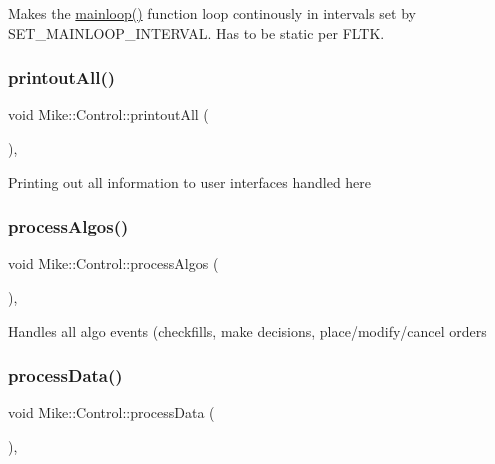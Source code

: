 Makes the \hyperlink{class_mike_1_1_control_a3440083f03f7da3d4490fa44bc13d62b}{mainloop()} function loop continously in intervals set by S\+E\+T\+\_\+\+M\+A\+I\+N\+L\+O\+O\+P\+\_\+\+I\+N\+T\+E\+R\+V\+AL. Has to be static per F\+L\+TK. \mbox{\label{class_mike_1_1_control_a2f239c6bace6fba6d31d54919b7ee6e1}} 
\subsubsection{\texorpdfstring{printout\+All()}{printoutAll()}}
{\footnotesize\ttfamily void Mike\+::\+Control\+::printout\+All (\begin{DoxyParamCaption}{ }\end{DoxyParamCaption})\hspace{0.3cm}{\ttfamily [inline]}, {\ttfamily [private]}}

Printing out all information to user interfaces handled here \mbox{\label{class_mike_1_1_control_acf3d41cb5dd54a2ee31cfb0709a79e7e}} 
\subsubsection{\texorpdfstring{process\+Algos()}{processAlgos()}}
{\footnotesize\ttfamily void Mike\+::\+Control\+::process\+Algos (\begin{DoxyParamCaption}{ }\end{DoxyParamCaption})\hspace{0.3cm}{\ttfamily [inline]}, {\ttfamily [private]}}

Handles all algo events (checkfills, make decisions, place/modify/cancel orders \mbox{\label{class_mike_1_1_control_a887652b2503a6e881fcceca36f0a0af9}} 
\subsubsection{\texorpdfstring{process\+Data()}{processData()}}
{\footnotesize\ttfamily void Mike\+::\+Control\+::process\+Data (\begin{DoxyParamCaption}{ }\end{DoxyParamCaption})\hspace{0.3cm}{\ttfamily [inline]}, {\ttfamily [private]}}

